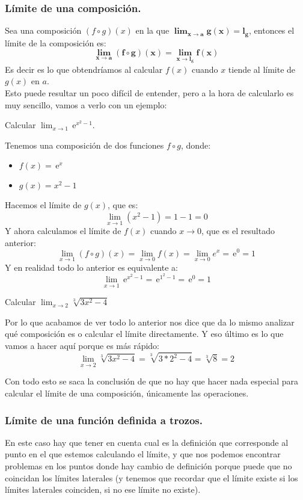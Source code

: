 \documentclass[a4paper,11pt,answers]{exam}
\newcommand{\e}{\,\mathrm{e}}
\begin{document}
\subsubsection{Límite de una composición.}
Sea una composición $(f \circ g)(x)$ en la que $\boldsymbol{\lim_{x \to a}g(x) = l_g}$, entonces el límite de la composición es:
\[\boldsymbol{\lim_{x \to a}(f \circ g)(x) = \lim_{x \to l_g} f(x)}\]
Es decir es lo que obtendríamos al calcular $f(x)$ cuando $x$ tiende al límite de $g(x)$ en $a$.\\

Esto puede resultar un poco difícil de entender, pero a la hora de calcularlo es muy sencillo, vamos a verlo con un ejemplo:\\
\begin{questions}

\question Calcular $\lim_{x \to 1}\e^{x^2 - 1}$.
\begin{solution}
Tenemos una composición de dos funciones $f\circ g$, donde:
\begin{itemize}
	\item $f(x) = \e^x$
	\item $g(x) = x^2 - 1$
\end{itemize}
Hacemos el límite de $g(x)$, que es:
\[\lim_{x \to 1} (x^2- 1) = 1 - 1 = 0\]
Y ahora calculamos el límite de $f(x)$ cuando $x \to 0$, que es el resultado anterior:
\[\lim_{x \to 1} (f \circ g)(x) = \lim_{x \to 0}f(x) = \lim_{x \to 0} e^x = \e^0 = 1\]
Y en realidad todo lo anterior es equivalente a:
\[\lim_{x \to 1} \e^{x^2 - 1} = \e^{1^2- 1} = \e^0 = 1\]
\end{solution}

\question Calcular $\lim_{x \to 2} \sqrt[3]{3x^2 - 4}$
\begin{solution}
Por lo que acabamos de ver todo lo anterior nos dice que  da lo mismo analizar qué composición es o calcular el límite directamente. Y eso último es lo que vamos a hacer aquí porque es más rápido:
\[\lim_{x \to 2} \sqrt[3]{3x^2 - 4} = \sqrt[3]{3*2^2 -4} = \sqrt[3]{8} = 2\]
\end{solution}
\end{questions}

Con todo esto se saca la conclusión de que no hay que hacer nada especial para calcular el límite de una composición, únicamente las operaciones.

\subsubsection{Límite de una función definida a trozos.}
En este caso hay que tener en cuenta cual es la definición que corresponde al punto en el que estemos calculando el límite, y que nos podemos encontrar problemas en los puntos donde hay cambio de definición porque puede que no coincidan los límites laterales (y tenemos que recordar que el límite existe si los límites laterales coinciden, si no ese límite no existe).
\end{document}

